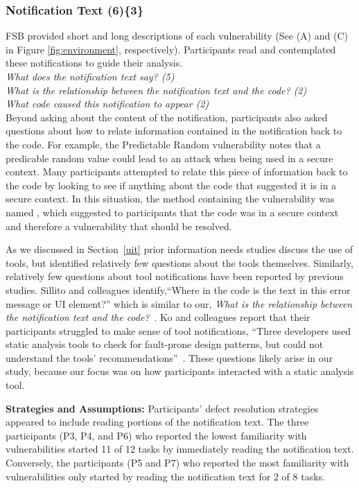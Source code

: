 \documentclass[10pt,journal,compsoc]{IEEEtran}
\begin{document}
\subsubsection{Notification Text (6)\{3\}}\label{em}

FSB provided short and long descriptions of each vulnerability (See (A) and (C) in Figure \ref{fig:environment}, respectively). 
Participants read and contemplated these notifications to guide their analysis.
\\

\noindent\emph{What does the notification text say? (5)} \\
\emph{What is the relationship between the notification text and the code? (2)} \\
\emph{What code caused this notification to appear (2)} 
\\

Beyond asking about the content of the notification, participants also asked questions about how to relate information contained in the notification back to the code. 
For example, the Predictable Random vulnerability notes that a predicable random value could lead to an attack when being used in a secure context. 
Many participants attempted to relate this piece of information back to the code by looking to see if anything about the code that suggested it is in a secure context. 
In this situation, the method containing the vulnerability was named , which suggested to participants that the code was in a secure context and therefore a vulnerability that should be resolved.


As we discussed in Section~\ref{uit} prior information needs studies discuss the use of tools, but identified relatively few questions about the tools themselves.
Similarly, relatively few questions about tool notifications have been reported by previous studies.
Sillito and colleagues identify,``Where in the code is the text in this error message or UI element?'' which is similar to our, \emph{What is the relationship between the notification text and the code?}~\cite{sillito2008asking}.
Ko and colleagues report that their participants struggled to make sense of tool notifications, ``Three developers used static analysis tools to check for
fault-prone design patterns, but could not understand the tools' recommendations''~\cite{Ko:2007:information}.
These questions likely arise in our study, because our focus was on how participants interacted with a static analysis tool.


\textbf{Strategies and Assumptions:}
Participants' defect resolution strategies appeared to include reading portions of the notification text. 
The three participants (P3, P4, and P6) who reported the lowest familiarity with vulnerabilities 
started 11 of 12 tasks by immediately reading the notification text. 
Conversely, the participants (P5 and P7) who reported the most familiarity with vulnerabilities only started by reading the notification text for 2 of 8 tasks.
\end{document}
